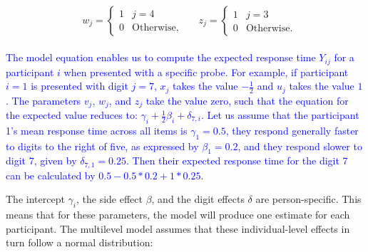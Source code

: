 \documentclass[
  english,
  doc,floatsintext]{apa6}
\begin{document}
\begin{align*}
&
\begin{aligned}
w_j = 
\begin{cases}
1 & j = 4\\
0 & \text{Otherwise},
\end{cases}
\end{aligned}
&
\begin{aligned}
z_j = 
\begin{cases}
1 & j = 3\\
0 & \text{Otherwise}.
\end{cases}
\end{aligned}
\end{align*}

\textcolor{blue}{The model equation enables us to compute the expected response time $Y_{ij}$ for a participant $i$ when presented with a specific probe. For example, if participant $i = 1$ is presented with digit $j = 7$, $x_j$ takes the value $-\frac{1}{2}$ and $u_j$ takes the value $1$. The parameters $v_j$, $w_j$, and $z_j$ take the value zero, such that the equation for the expected value reduces to: $\gamma_{i} + \frac{1}{2} \beta_{i} + \delta_{7,i}$. Let us assume that the participant 1's mean response time across all items is $\gamma_{1} = 0.5$, they respond generally faster to digits to the right of five, as expressed by $\beta_{1} = 0.2$, and they respond slower to digit 7, given by $\delta_{7,1} = 0.25$. Then their expected response time for the digit 7 can be calculated by $0.5 - 0.5 * 0.2 + 1 * 0.25$.}

The intercept \(\gamma_i\), the side effect \(\beta\), and the digit effects \(\delta\) are person-specific. This means that for these parameters, the model will produce one estimate for each participant. The multilevel model assumes that these individual-level effects in turn follow a normal distribution:
\end{document}
